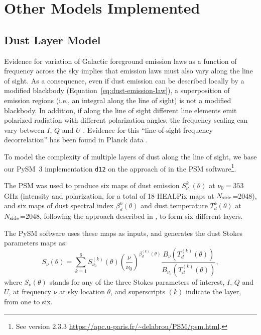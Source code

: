 \documentclass[twocolumn]{aastex631}
\begin{document}
\section{Other Models Implemented} \label{sec:other_models}

\subsection{Dust Layer Model} \label{sec:layers}
Evidence for variation of Galactic foreground emission laws as a function of frequency across the sky \citep[e.g.,][]{Krachmalnicoff:2018, Ade:2025} implies that emission laws must also vary along the line of sight. As a consequence, even if dust emission can be described locally by a modified blackbody (Equation~\ref{eq:dust-emission-law}), a superposition of emission regions (i.e., an integral along the line of sight) is not a modified blackbody. In addition, if along the line of sight different line elements emit polarized radiation with different polarization angles, the frequency scaling can vary between $I$, $Q$ and $U$ \citep{Tassis:2015}. Evidence for this ``line-of-sight frequency decorrelation'' has been found in Planck data \citep{Pelgrims:2021}.

To model the complexity of multiple layers of dust along the line of sight, we base our PySM~3 implementation \texttt{d12} on the approach of \cite{Martinez-Solaeche:2018} in the PSM software\footnote{See version 2.3.3 \url{https://apc.u-paris.fr/~delabrou/PSM/psm.html}.}. 

The PSM was used to produce six maps of dust emission $S_{\nu_0}^k(\theta)$ at $\nu_0 = 353$ GHz (intensity and polarization, for a total of 18 HEALPix maps at $N_{\rm side}$=2048), and six maps of dust spectral index $\beta_d^k(\theta)$ and dust temperature $T_d^k(\theta)$ at $N_{\rm side}$=2048, following the approach described in \cite{Martinez-Solaeche:2018}, to form six different layers.

The PySM software uses these maps as inputs, and generates the dust Stokes parameters maps as:
\begin{equation}
    S_\nu(\theta) = \sum_{k=1}^6 S^{(k)}_{\nu_0}(\theta)
    \left( \frac{\nu}{\nu_0} \right)^{\beta^{(k)}_d(\theta)}
    \frac{B_\nu(T^{(k)}_d(\theta))}{B_{\nu_0}(T^{(k)}_d(\theta))},
\end{equation}
where $S_\nu(\theta)$ stands for any of the three Stokes parameters of interest, $I$, $Q$ and $U$, at frequency $\nu$ at sky location $\theta$, and superscripts ${(k)}$ indicate the layer, from one to six.
\end{document}
